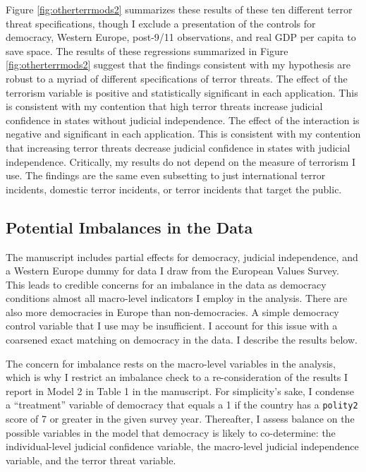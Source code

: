 \documentclass[11pt,]{article}
\begin{document}
Figure \ref{fig:otherterrmods2} summarizes these results of these ten
different terror threat specifications, though I exclude a presentation
of the controls for democracy, Western Europe, post-9/11 observations,
and real GDP per capita to save space. The results of these regressions
summarized in Figure \ref{fig:otherterrmods2} suggest that the findings
consistent with my hypothesis are robust to a myriad of different
specifications of terror threats. The effect of the terrorism variable
is positive and statistically significant in each application. This is
consistent with my contention that high terror threats increase judicial
confidence in states without judicial independence. The effect of the
interaction is negative and significant in each application. This is
consistent with my contention that increasing terror threats decrease
judicial confidence in states with judicial independence. Critically, my
results do not depend on the measure of terrorism I use. The findings
are the same even subsetting to just international terror incidents,
domestic terror incidents, or terror incidents that target the public.

\subsection{Potential Imbalances in the
Data}\label{potential-imbalances-in-the-data}

The manuscript includes partial effects for democracy, judicial
independence, and a Western Europe dummy for data I draw from the
European Values Survey. This leads to credible concerns for an imbalance
in the data as democracy conditions almost all macro-level indicators I
employ in the analysis. There are also more democracies in Europe than
non-democracies. A simple democracy control variable that I use may be
insufficient. I account for this issue with a coarsened exact matching
on democracy \citep{iacusetal2012cibc} in the data. I describe the
results below.

The concern for imbalance rests on the macro-level variables in the
analysis, which is why I restrict an imbalance check to a
re-consideration of the results I report in Model 2 in Table 1 in the
manuscript. For simplicity's sake, I condense a ``treatment'' variable
of democracy that equals a 1 if the country has a \texttt{polity2} score
\citep[c.f.][]{marshalljaggers2002piv} of 7 or greater in the given
survey year. Thereafter, I assess balance on the possible variables in
the model that democracy is likely to co-determine: the individual-level
judicial confidence variable, the macro-level judicial independence
variable, and the terror threat variable.
\end{document}
